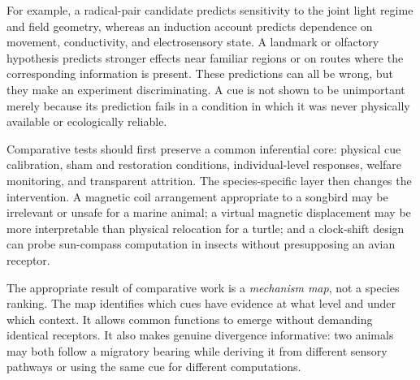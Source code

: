 \documentclass[conference]{IEEEtran}
\begin{document}
For example, a radical-pair candidate predicts sensitivity to the joint light regime and field geometry, whereas an induction account predicts dependence on movement, conductivity, and electrosensory state. A landmark or olfactory hypothesis predicts stronger effects near familiar regions or on routes where the corresponding information is present. These predictions can all be wrong, but they make an experiment discriminating. A cue is not shown to be unimportant merely because its prediction fails in a condition in which it was never physically available or ecologically reliable.

Comparative tests should first preserve a common inferential core: physical cue calibration, sham and restoration conditions, individual-level responses, welfare monitoring, and transparent attrition. The species-specific layer then changes the intervention. A magnetic coil arrangement appropriate to a songbird may be irrelevant or unsafe for a marine animal; a virtual magnetic displacement may be more interpretable than physical relocation for a turtle; and a clock-shift design can probe sun-compass computation in insects without presupposing an avian receptor.

The appropriate result of comparative work is a \emph{mechanism map}, not a species ranking. The map identifies which cues have evidence at what level and under which context. It allows common functions to emerge without demanding identical receptors. It also makes genuine divergence informative: two animals may both follow a migratory bearing while deriving it from different sensory pathways or using the same cue for different computations.
\end{document}
